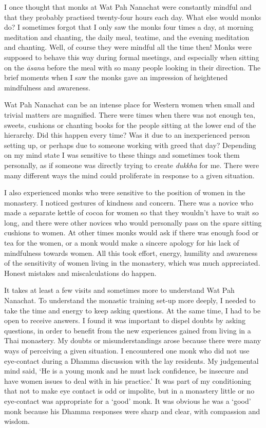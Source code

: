 I once thought that monks at Wat Pah Nanachat were constantly mindful
and that they probably practised twenty-four hours each day. What else
would monks do? I sometimes forgot that I only saw the monks four times
a day, at morning meditation and chanting, the daily meal, teatime, and
the evening meditation and chanting. Well, of course they were mindful
all the time then! Monks were supposed to behave this way during formal
meetings, and especially when sitting on the \emph{āsana} before the
meal with so many people looking in their direction. The brief moments
when I saw the monks gave an impression of heightened mindfulness and
awareness. 

Wat Pah Nanachat can be an intense place for Western women when small
and trivial matters are magnified. There were times when there was not
enough tea, sweets, cushions or chanting books for the people sitting at
the lower end of the hierarchy. Did this happen every time? Was it due
to an inexperienced person setting up, or perhaps due to someone working
with greed that day? Depending on my mind state I was sensitive to these
things and sometimes took them personally, as if someone was directly
trying to create \emph{dukkha} for me. There were many different ways
the mind could proliferate in response to a given situation. 

I also experienced monks who were sensitive to the position of women in
the monastery. I noticed gestures of kindness and concern. There was a
novice who made a separate kettle of cocoa for women so that they
wouldn't have to wait so long, and there were other novices who would
personally pass on the spare sitting cushions to women. At other times
monks would ask if there was enough food or tea for the women, or a monk
would make a sincere apology for his lack of mindfulness towards women. 
All this took effort, energy, humility and awareness of the sensitivity
of women living in the monastery, which was much appreciated. Honest
mistakes and miscalculations do happen. 

It takes at least a few visits and sometimes more to understand Wat Pah
Nanachat. To understand the monastic training set-up more deeply, I
needed to take the time and energy to keep asking questions. At the same
time, I had to be open to receive answers. I found it was important to
dispel doubts by asking questions, in order to benefit from the new
experiences gained from living in a Thai monastery. My doubts or
misunderstandings arose because there were many ways of perceiving a
given situation. I encountered one monk who did not use eye-contact
during a Dhamma discussion with the lay residents. My judgemental mind
said, `He is a young monk and he must lack confidence, be insecure and
have women issues to deal with in his practice.' It was part of my
conditioning that not to make eye contact is odd or impolite, but in a
monastery little or no eye-contact was appropriate for a `good' monk. It
was obvious he was a `good' monk because his Dhamma responses were sharp
and clear, with compassion and wisdom. 

